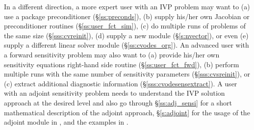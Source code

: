 In a different direction, a more expert user with an IVP problem may want to 
(a) use a package preconditioner (\S\ref{ss:preconds}), 
(b) supply his/her own Jacobian or preconditioner routines (\S\ref{ss:user_fct_sim}),
(c) do multiple runs of problems of the same size (\S\ref{sss:cvreinit}), 
(d) supply a new {\nvector} module (\S\ref{s:nvector}), or even 
(e) supply a different linear solver module (\S\ref{ss:cvodes_org}).
An advanced user with a forward sensitivity problem may also want to
(a) provide his/her own sensitivity equations right-hand side routine
(\S\ref{ss:user_fct_fwd}), (b) perform multiple runs with the same number of
sensitivity parameters (\S\ref{sss:cvsreinit}), or (c) extract additional
diagnostic information (\S\ref{sss:cvodesensextract}).
A user with an adjoint sensitivity problem needs to understand the IVP 
solution approach at the desired level and also go through 
\S\ref{ss:adj_sensi} for a short mathematical description of the adjoint
approach, \S\ref{s:adjoint} for the usage of the adjoint module in {\cvodes},
and the examples in \cite{cvodes1.1_ex}.

